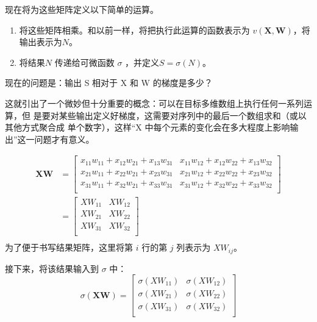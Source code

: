 现在将为这些矩阵定义以下简单的运算。
\begin{enumerate}
    \item 将这些矩阵相乘。和以前一样，将把执行此运算的函数表示为 $v(\bm{X}, \bm{W})$，将输出表示为$N$。
    \item  将结果$N$ 传递给可微函数 $\sigma$ ，并定义$S=\sigma(N)$。
\end{enumerate}

现在的问题是：输出 S 相对于 X 和 W 的梯度是多少？

这就引出了一个微妙但十分重要的概念：可以在目标多维数组上执行任何一系列运算，但
是要对某些输出定义好梯度，这需要对序列中的最后一个数组求和（或以其他方式聚合成
单个数字），这样“X 中每个元素的变化会在多大程度上影响输出”这一问题才有意义。

\begin{equation*}
    \begin{aligned}
        \bm{X}\bm{W} & =
        \left[
            \begin{matrix}
                x_{11}w_{11}+x_{12}w_{21}+x_{13}w_{31} & x_{11}w_{12}+x_{12}w_{22}+x_{13}w_{32} \\
                x_{21}w_{11}+x_{22}w_{21}+x_{23}w_{31} & x_{21}w_{12}+x_{22}w_{22}+x_{23}w_{32} \\
                x_{31}w_{11}+x_{32}w_{21}+x_{33}w_{31} & x_{31}w_{12}+x_{32}w_{22}+x_{33}w_{32} \\
            \end{matrix}
        \right]                \\
                     & =\left[
            \begin{matrix}
                XW_{11} & XW_{12} \\
                XW_{21} & XW_{22} \\
                XW_{31} & XW_{32} \\
            \end{matrix}
        \right]                \\
    \end{aligned}
\end{equation*}
为了便于书写结果矩阵，这里将第 $i$ 行的第 $j$ 列表示为
$XW_{ij}$。

接下来，将该结果输入到 $\sigma$ 中：
\begin{equation*}
    \sigma(\bm{X}\bm{W}) =
    \left[
        \begin{matrix}
            \sigma(XW_{11}) & \sigma(XW_{12}) \\
            \sigma(XW_{21}) & \sigma(XW_{22}) \\
            \sigma(XW_{31}) & \sigma(XW_{32}) \\
        \end{matrix}
        \right]
\end{equation*}

